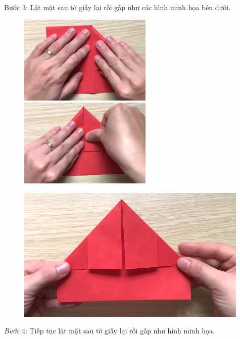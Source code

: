 \begin{multicols}{2}
\begin{figure}[H]
			\vspace*{-15pt}
		\end{figure}
	Bước $3$: Lật mặt sau tờ giấy lại rồi gấp như các hình minh họa bên dưới. 
	\begin{figure}[H]
			\vspace*{-5pt}
			\centering
			\captionsetup{labelformat= empty, justification=centering}
			\includegraphics[height= 0.327\linewidth]{23}
			\includegraphics[height= 0.327\linewidth]{24}
			\vspace*{-15pt}
		\end{figure}
		\begin{figure}[H]
			\vspace*{5pt}
			\centering
			\captionsetup{labelformat= empty, justification=centering}
			\includegraphics[width=1\linewidth]{25}
			\vspace*{-15pt}
		\end{figure}
	\textit{Bước} $4$: Tiếp tục lật mặt sau tờ giấy lại rồi gấp như hình minh họa. 

\end{multicols}
